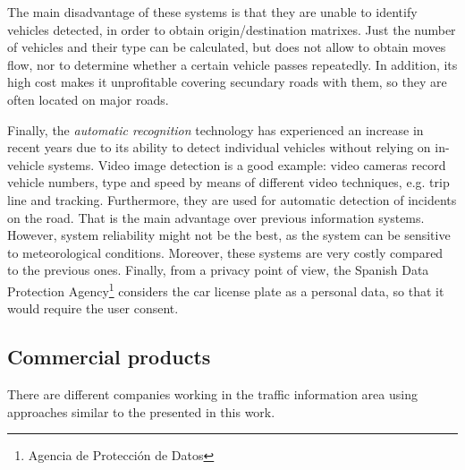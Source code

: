 \documentclass[preprint,authoryear,12pt]{elsarticle}
\begin{document}
The main disadvantage of these systems is that they are unable to identify vehicles detected, in order to obtain origin/destination matrixes.
Just the number of vehicles and their type can be calculated, but does not allow to obtain moves flow, nor to determine whether a certain vehicle passes repeatedly.
In addition, its high cost makes it unprofitable covering secundary roads with them, so they are often located on major roads.

Finally, the \emph{automatic recognition} technology has experienced an increase in recent years due to its ability to detect individual vehicles without relying on in-vehicle systems. 
Video image detection is a good example: video cameras record vehicle numbers, type and speed by means of different video techniques, e.g. trip line and tracking. 
Furthermore, they are used for automatic detection of incidents on the road. 
That is the main advantage over previous information systems.
However, system reliability might not be the best, as the system can be sensitive to meteorological conditions.
Moreover, these systems are very costly compared to the previous ones.
Finally, from a privacy point of view, the Spanish Data Protection Agency\footnote{Agencia de Protección de Datos} considers the car license plate as a personal data, so that it would require the user consent.




\subsection{Commercial products}
There are different companies working in the traffic information area using approaches similar to the presented in this work.
\end{document}
